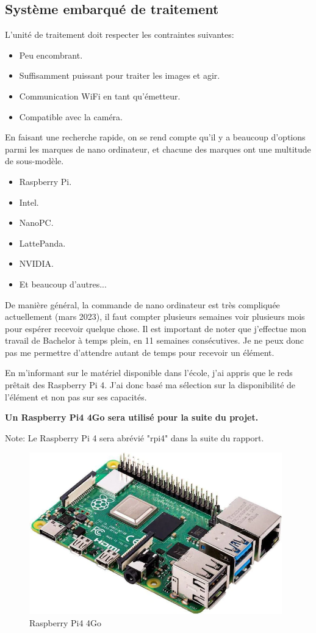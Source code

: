 \subsection{Système embarqué de traitement}
L'unité de traitement doit respecter les contraintes suivantes:
\begin{itemize}
    \item Peu encombrant.
    \item Suffisamment puissant pour traiter les images et agir.
    \item Communication WiFi en tant qu'émetteur.
    \item Compatible avec la caméra.
\end{itemize}
En faisant une recherche rapide, on se rend compte qu'il y a beaucoup d'options parmi les marques de nano ordinateur,
et chacune des marques ont une multitude de sous-modèle.
\begin{itemize}
    \item Raspberry Pi.
    \item Intel.
    \item NanoPC.
    \item LattePanda.
    \item NVIDIA.
    \item Et beaucoup d'autres...
\end{itemize}
De manière général, la commande de nano ordinateur est très compliquée actuellement (mars 2023), il faut compter plusieurs semaines voir plusieurs mois
pour espérer recevoir quelque chose. Il est important de noter que j'effectue mon travail de Bachelor à temps plein, en 11 semaines consécutives.
Je ne peux donc pas me permettre d'attendre autant de temps pour recevoir un élément.

En m'informant sur le matériel disponible dans l'école, j'ai appris que le \Gls{reds} prêtait des Raspberry Pi 4.
J'ai donc basé ma sélection sur la disponibilité de l'élément et non pas sur ses capacités.

\textbf{Un Raspberry Pi4 4Go sera utilisé pour la suite du projet.}

Note: Le Raspberry Pi 4 sera abrévié "\Gls{rpi4}" dans la suite du rapport.

\begin{figure}[H]
    \centering
    \includegraphics[height=7cm]{assets/figures/rpi4.png}
    \caption{Raspberry Pi4 4Go}
\end{figure}

